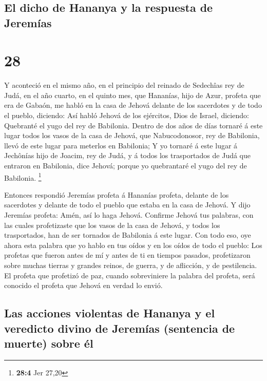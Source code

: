 \hypertarget{el-dicho-de-hananya-y-la-respuesta-de-jeremuxedas}{%
\subsection{El dicho de Hananya y la respuesta de
Jeremías}\label{el-dicho-de-hananya-y-la-respuesta-de-jeremuxedas}}

\hypertarget{section-27}{%
\section{28}\label{section-27}}

 Y aconteció en el mismo año, en el principio del reinado de
Sedechîas rey de Judá, en el año cuarto, en el quinto mes, que Hananías,
hijo de Azur, profeta que era de Gabaón, me habló en la casa de Jehová
delante de los sacerdotes y de todo el pueblo, diciendo: 
Así habló Jehová de los ejércitos, Dios de Israel, diciendo: Quebranté
el yugo del rey de Babilonia.  Dentro de dos años de días
tornaré á este lugar todos los vasos de la casa de Jehová, que
Nabucodonosor, rey de Babilonia, llevó de este lugar para meterlos en
Babilonia;  Y yo tornaré á este lugar á Jechônías hijo de
Joacim, rey de Judá, y á todos los trasportados de Judá que entraron en
Babilonia, dice Jehová; porque yo quebrantaré el yugo del rey de
Babilonia. \footnote{\textbf{28:4} Jer 27,20}

 Entonces respondió Jeremías profeta á Hananías profeta,
delante de los sacerdotes y delante de todo el pueblo que estaba en la
casa de Jehová.  Y dijo Jeremías profeta: Amén, así lo haga
Jehová. Confirme Jehová tus palabras, con las cuales profetizaste que
los vasos de la casa de Jehová, y todos los trasportados, han de ser
tornados de Babilonia á este lugar.  Con todo eso, oye ahora
esta palabra que yo hablo en tus oídos y en los oídos de todo el pueblo:
 Los profetas que fueron antes de mí y antes de ti en
tiempos pasados, profetizaron sobre muchas tierras y grandes reinos, de
guerra, y de aflicción, y de pestilencia.  El profeta que
profetizó de paz, cuando sobreviniere la palabra del profeta, será
conocido el profeta que Jehová en verdad lo envió.

\hypertarget{las-acciones-violentas-de-hananya-y-el-veredicto-divino-de-jeremuxedas-sentencia-de-muerte-sobre-uxe9l}{%
\subsection{Las acciones violentas de Hananya y el veredicto divino de
Jeremías (sentencia de muerte) sobre
él}\label{las-acciones-violentas-de-hananya-y-el-veredicto-divino-de-jeremuxedas-sentencia-de-muerte-sobre-uxe9l}}

